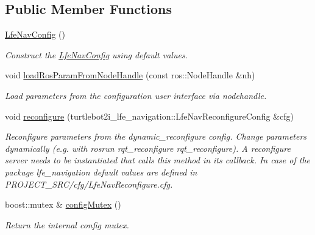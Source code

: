 \subsection*{Public Member Functions}
\begin{DoxyCompactItemize}
\item 
\hyperlink{classlfe__navigation_1_1LfeNavConfig_af9b952c60d7d4ae10d84ac2f909edcdb}{Lfe\+Nav\+Config} ()
\begin{DoxyCompactList}\small\item\em Construct the \hyperlink{classlfe__navigation_1_1LfeNavConfig}{Lfe\+Nav\+Config} using default values. \end{DoxyCompactList}\item 
void \hyperlink{classlfe__navigation_1_1LfeNavConfig_a05137fe69a2433269ad8912d66d1451a}{load\+Ros\+Param\+From\+Node\+Handle} (const ros\+::\+Node\+Handle \&nh)
\begin{DoxyCompactList}\small\item\em Load parameters from the configuration user interface via nodehandle. \end{DoxyCompactList}\item 
void \hyperlink{classlfe__navigation_1_1LfeNavConfig_ac864482619cd6e9b864f0d7313c2ef70}{reconfigure} (turtlebot2i\+\_\+lfe\+\_\+navigation\+::\+Lfe\+Nav\+Reconfigure\+Config \&cfg)
\begin{DoxyCompactList}\small\item\em Reconfigure parameters from the dynamic\+\_\+reconfigure config. Change parameters dynamically (e.\+g. with {\ttfamily rosrun rqt\+\_\+reconfigure rqt\+\_\+reconfigure}). A reconfigure server needs to be instantiated that calls this method in it\textquotesingle{}s callback. In case of the package {\itshape lfe\+\_\+navigation} default values are defined in {\itshape P\+R\+O\+J\+E\+C\+T\+\_\+\+S\+R\+C/cfg/\+Lfe\+Nav\+Reconfigure.\+cfg}. \end{DoxyCompactList}\item 
boost\+::mutex \& \hyperlink{classlfe__navigation_1_1LfeNavConfig_a73965acf1db0ac8392f1afff462ff283}{config\+Mutex} ()\hypertarget{classlfe__navigation_1_1LfeNavConfig_a73965acf1db0ac8392f1afff462ff283}{}\label{classlfe__navigation_1_1LfeNavConfig_a73965acf1db0ac8392f1afff462ff283}

\begin{DoxyCompactList}\small\item\em Return the internal config mutex. \end{DoxyCompactList}\end{DoxyCompactItemize}
